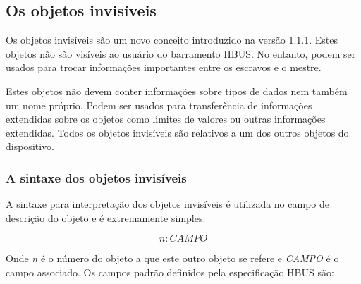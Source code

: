 \begin{table}[H]
\centering
\caption{Formatação dos objetos do tipo vetor de bytes}
\end{table}

\subsection{Os objetos invisíveis}
\label{sec:hiddenobj}

Os objetos invisíveis são um novo conceito introduzido na versão 1.1.1. Estes objetos não são visíveis ao usuário do barramento HBUS. No entanto, podem ser usados para trocar informações importantes entre os escravos e o mestre.

Estes objetos não devem conter informações sobre tipos de dados nem também um nome próprio. Podem ser usados para transferência de informações extendidas sobre os objetos como limites de valores ou outras informações extendidas. Todos os objetos invisíveis são relativos a um dos outros objetos do dispositivo.

\subsubsection*{A sintaxe dos objetos invisíveis}

A sintaxe para interpretação dos objetos invisíveis é utilizada no campo de descrição do objeto e é extremamente simples:

\begin{equation*}
n:CAMPO
\end{equation*}

Onde \textit{n} é o número do objeto a que este outro objeto se refere e \textit{CAMPO} é o campo associado. Os campos padrão definidos pela especificação HBUS são:

